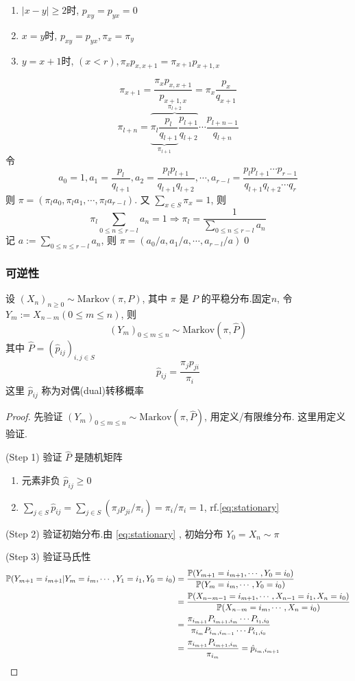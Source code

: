 \begin{enumerate}
    \item $|x-y|\geq 2$时, $p_{xy}=p_{yx}=0$
    \item $x=y$时, $p_{xy}=p_{yx},\pi_x=\pi_y$
    \item $y=x+1$时, $(x<r),\pi_x p_{x,x+1}=\pi_{x+1}p_{x+1,x}$
\end{enumerate}
\[
\pi_{x+1}=\frac{\pi_x p_{x,x+1}}{p_{x+1,x}}=\pi_x\frac{p_x}{q_{x+1}}
\]
\[
\pi_{l+n}=\overbrace{\underbrace{\pi_l\frac{p_l}{q_{l+1}}}_{\pi_{l+1}} \frac{p_{l+1}}{q_{l+2}}}^{\pi_{l+2}}\cdots \frac{p_{l+n-1}}{q_{l+n}}
\]
令 
\[a_0=1,a_1=\frac{p_l}{q_{l+1}},a_2=\frac{p_l p_{l+1}}{q_{l+1} q_{l+2}},\cdots,a_{r-l}=\frac{p_lp_{l+1}\cdots p_{r-1}}{q_{l+1}q_{l+2}\cdots q_r}
\]
则 $\pi=(\pi_l a_0,\pi_l a_1,\cdots, \pi_l a_{r-l})$. 又 $\sum_{x\in S}\pi_x=1$, 则
\[
\pi_l\sum_{0\leq n\leq r-l}a_n=1\Rightarrow \pi_l=\frac{1}{\sum_{0\leq n\leq r-l}a_n}
\]
记 $a:=\sum_{0\leq n\leq r-l}a_n$, 则 $\pi=(a_0/a,a_1/a,\cdots,a_{r-l}/a)$\qed

\subsubsection{可逆性}

\begin{theorem}
    设 $(X_n)_{n\geq 0}\sim \text{Markov}(\pi,P)$, 其中 $\pi$ 是 $P$ 的平稳分布.固定$n$, 令 $Y_m:=X_{n-m}(0\leq m\leq n)$, 则
    \[
    (Y_m)_{0\leq m\leq n}\sim\text{Markov}(\pi,\hat{P})
    \]
    其中 $\hat{P}=(\hat{p}_{ij})_{i,j\in S}$
    \[
    \hat{p}_{ij}=\frac{\pi_j p_{ji}}{\pi_i}
    \]
    这里 $\hat{p}_{ij}$ 称为对偶(dual)转移概率
\end{theorem}
\begin{proof}
先验证 $(Y_m)_{0\leq m\leq n}\sim \text{Markov}(\pi,\hat{P})$, 用定义/有限维分布. 这里用定义验证.

(Step 1) 验证 $\hat{P}$ 是随机矩阵
\begin{enumerate}
    \item 元素非负 $\hat{p}_{ij}\geq 0$
    \item $\sum_{j\in S}\hat{p}_{ij}=\sum_{j\in S}(\pi_j p_{ji}/\pi_i)=\pi_i/\pi_i=1$, rf.\eqref{eq:stationary}
\end{enumerate}

(Step 2) 验证初始分布.由 \eqref{eq:stationary} , 初始分布 $Y_0=X_n\sim \pi$

(Step 3) 验证马氏性
\[
\begin{aligned}
    \mathbb{P}(Y_{m+1}=i_{m+1}|Y_m=i_m,\cdots,Y_1=i_1,Y_0=i_0)&=\frac{\mathbb{P}(Y_{m+1}=i_{m+1},\cdots,Y_0=i_0)}{\mathbb{P}(Y_m=i_m,\cdots,Y_0=i_0)}\\
    &=\frac{\mathbb{P}(X_{n-m-1}=i_{m+1},\cdots,X_{n-1}=i_1,X_n=i_0)}{\mathbb{P}(X_{n-m}=i_m,\cdots,X_n=i_0)}\\
    &=\frac{\pi_{i_{m+1}}P_{i_{m+1},i_m}\cdots P_{i_1,i_0}}{\pi_{i_m}P_{i_m,i_{m-1}}\cdots P_{i_1,i_0}}\\
    &=\frac{\pi_{i_{m+1}}P_{i_{m+1},i_m}}{\pi_{i_m}}=\hat{p}_{i_m,i_{m+1}}
\end{aligned}
\]
\end{proof}

